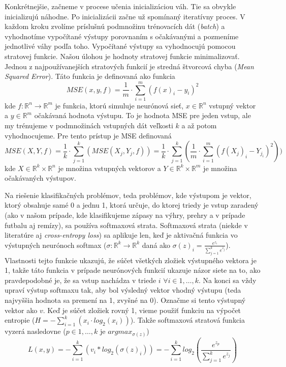 Konkrétnejšie, začneme v procese učenia inicializáciou váh. Tie sa obvykle inicializujú náhodne.
Po inicializácii začne už spomínaný iteratívny proces.
V každom kroku zvolíme príslušnú podmnožinu trénovacích dát (\textit{batch}) a vyhodnotíme vypočítané výstupy porovnaním s očakávanými a pozmeníme jednotlivé váhy podľa toho.
Vypočítané výstupy sa vyhodnocujú pomocou stratovej funkcie.
Našou úlohou je hodnoty stratovej funkcie minimalizovať.
Jednou z najpoužívanejších stratových funkcií je stredná štvorcová chyba (\textit{Mean Squared Error}). Táto funkcia je definovaná ako funkcia $$MSE(x,y,f) = \frac{1}{m} \cdot \sum_{i=1}^m (f(x)_i - y_i)^2$$
kde
$f: \mathbb{R}^n \to \mathbb{R}^m$ je funkcia, ktorú simuluje neurónová sieť, $x \in \mathbb{R}^n$ vstupný vektor a $y \in \mathbb{R}^m$ očakávaná hodnota výstupu.
To je hodnota MSE pre jeden vstup, ale my trénujeme v podmnožinách vstupných dát veľkosti $k$ a až potom vyhodnocujeme. 
Pre tento prístup je MSE definovaná $$MSE(X,Y,f) = \frac{1}{k} \cdot \sum_{j=1}^k (MSE(X_j,Y_j,f)) = \frac{1}{k} \cdot \sum_{j=1}^k (\frac{1}{m} \cdot \sum_{i=1}^m  (f(X_j)_i - Y_{j_i})^2)) $$
kde $X \in \mathbb{R}^k \times \mathbb{R}^n$ je množina vstupných vektorov a $Y \in \mathbb{R}^k \times \mathbb{R}^m$ je množina očakávaných výstupov.

Na riešenie klasifikačných problémov, teda problémov, kde výstupom je vektor, ktorý obsahuje samé 0 a jednu 1, ktorá určuje, do ktorej triedy je vstup zaradený (ako v našom prípade, kde klasifikujeme zápasy na výhry, prehry a v prípade futbalu aj remízy), sa používa softmaxová strata.
Softmaxová strata (niekde v literatúre aj \textit{cross-entropy loss}) sa aplikuje len, keď je aktivačná funkcia vo výstupných neurónoch softmax ($\sigma: \mathbb{R}^k \to \mathbb{R}^k$ daná ako $\sigma(z)_i = \frac{e^{z_i}}{\sum_{j=1}^k e^{z_j}}$).
Vlastnosti tejto funkcie ukazujú, že súčet všetkých zložiek výstupného vektora je 1, takže táto funkcia v prípade neurónových funkcií ukazuje názor siete na to, ako pravdepodobné je, že sa vstup nachádza v triede $i$ $\forall i \in {1,\dots , k}$.
Na konci sa vždy upraví výstup softmaxu tak, aby bol výsledný vektor vhodný výstupu (teda najvyššia hodnota sa premení na 1, zvyšné na 0). Označme si tento výstupný vektor ako $v$.
Keď je súčet zložiek rovný 1, vieme použiť funkciu na výpočet entropie ($ H = -\sum_{i=1}^k \left(x_i \cdot log_2(x_i)\right) $).
Takže softmaxová stratová funkcia vyzerá nasledovne ($p \in {1,\dots ,k}$ je $argmax_{\sigma(z)}$)
$$L(x,y) = -\sum_{i=1}^k \left(v_i*log_2(\sigma(z)_i)\right) = -\sum_{i=1}^k log_2\left(\frac{e^{z_p}}{\sum_{j=1}^k e^{z_{j}}}\right)  $$

